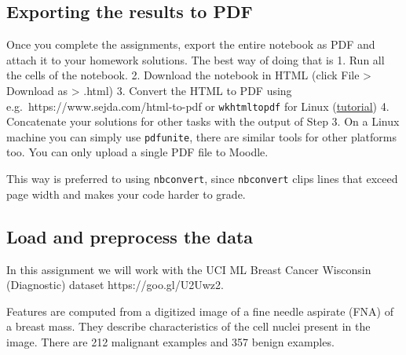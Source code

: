 \documentclass[11pt]{article}
\begin{document}
    \hypertarget{exporting-the-results-to-pdf}{%
\subsection{Exporting the results to
PDF}\label{exporting-the-results-to-pdf}}

Once you complete the assignments, export the entire notebook as PDF and
attach it to your homework solutions. The best way of doing that is 1.
Run all the cells of the notebook. 2. Download the notebook in HTML
(click File \textgreater{} Download as \textgreater{} .html) 3. Convert
the HTML to PDF using e.g.~https://www.sejda.com/html-to-pdf or
\texttt{wkhtmltopdf} for Linux
(\href{https://www.cyberciti.biz/open-source/html-to-pdf-freeware-linux-osx-windows-software/}{tutorial})
4. Concatenate your solutions for other tasks with the output of Step 3.
On a Linux machine you can simply use \texttt{pdfunite}, there are
similar tools for other platforms too. You can only upload a single PDF
file to Moodle.

This way is preferred to using \texttt{nbconvert}, since
\texttt{nbconvert} clips lines that exceed page width and makes your
code harder to grade.

    \hypertarget{load-and-preprocess-the-data}{%
\subsection{Load and preprocess the
data}\label{load-and-preprocess-the-data}}

    In this assignment we will work with the UCI ML Breast Cancer Wisconsin
(Diagnostic) dataset https://goo.gl/U2Uwz2.

Features are computed from a digitized image of a fine needle aspirate
(FNA) of a breast mass. They describe characteristics of the cell nuclei
present in the image. There are 212 malignant examples and 357 benign
examples.
\end{document}
